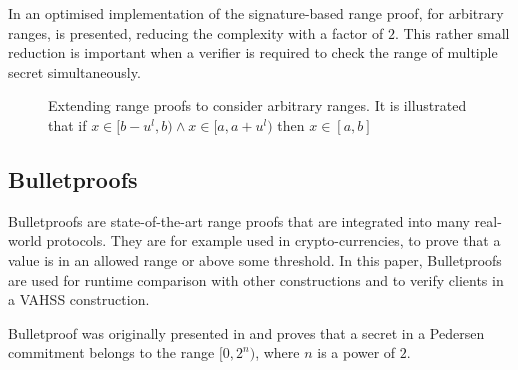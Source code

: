 In \cite{arbitary_range_opt} an optimised implementation of the signature-based range proof, for arbitrary ranges, is presented, reducing the complexity with a factor of $2$. This rather small reduction is important when a verifier is required to check the range of multiple secret simultaneously.

\begin{figure}[]
    \centering
    \caption{Extending range proofs to consider arbitrary ranges. It is illustrated that if $x\in[b-u^l,b)\wedge x\in[a,a+u^l)$ then $x\in[a,b]$}
    \label{fig:interval}
\end{figure}


\subsection*{Bulletproofs}
Bulletproofs are state-of-the-art range proofs that are integrated into many real-world protocols. They are for example used in crypto-currencies, to prove that a value is in an allowed range or above some threshold. In this paper, Bulletproofs are used for runtime comparison with other constructions and to verify clients in a VAHSS construction.


Bulletproof was originally presented in \cite{bulletProofs_theory} and proves that a secret in a Pedersen commitment belongs to the range $[0,2^n)$, where $n$ is  a power of $2$. 

